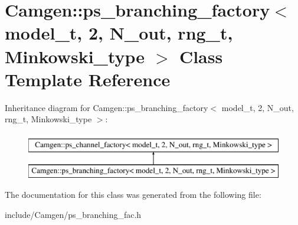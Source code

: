 \hypertarget{a00448}{}\section{Camgen\+:\+:ps\+\_\+branching\+\_\+factory$<$ model\+\_\+t, 2, N\+\_\+out, rng\+\_\+t, Minkowski\+\_\+type $>$ Class Template Reference}
\label{a00448}
Inheritance diagram for Camgen\+:\+:ps\+\_\+branching\+\_\+factory$<$ model\+\_\+t, 2, N\+\_\+out, rng\+\_\+t, Minkowski\+\_\+type $>$\+:\begin{figure}[H]
\begin{center}
\leavevmode
\includegraphics[height=2.000000cm]{a00448}
\end{center}
\end{figure}


The documentation for this class was generated from the following file\+:\begin{DoxyCompactItemize}
\item 
include/\+Camgen/ps\+\_\+branching\+\_\+fac.\+h\end{DoxyCompactItemize}
